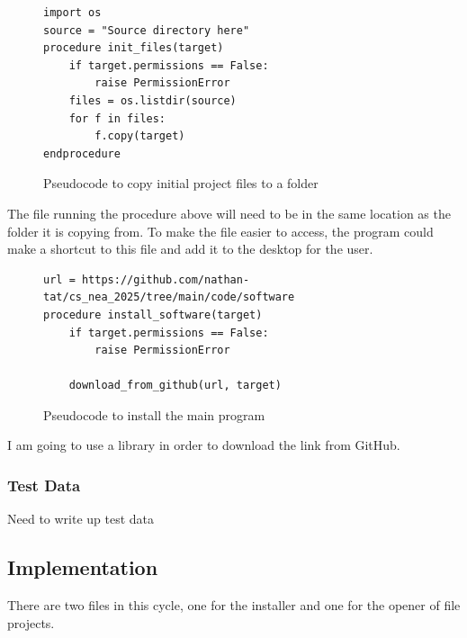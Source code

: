 \documentclass[11pt]{article}
\begin{document}
            \begin{figure}[!ht]
                \begin{verbatim}
import os
source = "Source directory here"
procedure init_files(target)
    if target.permissions == False:
        raise PermissionError
    files = os.listdir(source)
    for f in files:
        f.copy(target)
endprocedure
                \end{verbatim}
                \caption{Pseudocode to copy initial project files to a folder}
                \label{pc:copy_to_folder}
            \end{figure}

            The file running the procedure above will need to be in the same location as the folder it is copying from. To make the file easier to access, the program could make a shortcut to this file and add it to the desktop for the user.
            
            \begin{figure}[!ht]
               \begin{verbatim}
url = https://github.com/nathan-tat/cs_nea_2025/tree/main/code/software
procedure install_software(target)
    if target.permissions == False:
        raise PermissionError
    
    download_from_github(url, target)
               \end{verbatim}
               \caption{Pseudocode to install the main program}
               \label{pc:install_sw}
            \end{figure}

            I am going to use a library in order to download the link from GitHub.
        \subsubsection{Test Data}
            Need to write up test data

        

    \subsection{Implementation}
            There are two files in this cycle, one for the installer and one for the opener of file projects.
\end{document}

